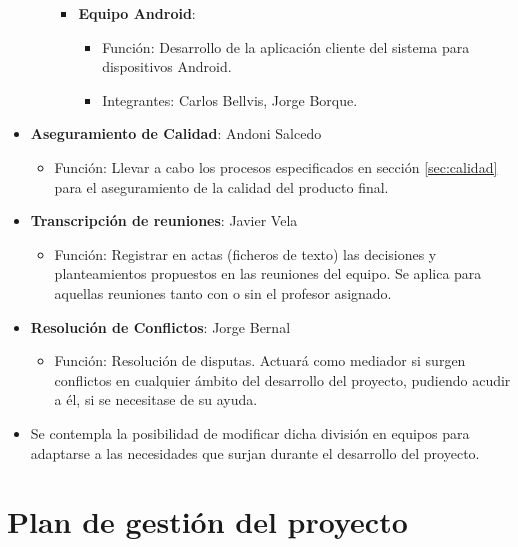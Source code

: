 \documentclass{article}
\begin{document}
\begin{itemize}
\begin{itemize}
\begin{itemize}
\begin{itemize}
            \end{itemize}
            \item \textbf{Equipo Android}:
            \begin{itemize}
                \setlength{\itemsep}{0em}
                \item Función: Desarrollo de la aplicación cliente del sistema para dispositivos Android.
                \item Integrantes: Carlos Bellvis, Jorge Borque.
            \end{itemize}
        \end{itemize}
    \end{itemize}
    \item \textbf{Aseguramiento de Calidad}: Andoni Salcedo
    \begin{itemize}
        \setlength{\itemsep}{0em}
        \item Función: Llevar a cabo los procesos especificados en sección \ref{sec:calidad} para el aseguramiento de la calidad del producto final.
    \end{itemize}
    \item \textbf{Transcripción de reuniones}: Javier Vela
    \begin{itemize}
        \setlength{\itemsep}{0em}
        \item Función: Registrar en actas (ficheros de texto) las decisiones y planteamientos propuestos en las reuniones del equipo. Se aplica para aquellas reuniones tanto con o sin el profesor asignado.
    \end{itemize}
    \item \textbf{Resolución de Conflictos}: Jorge Bernal
    \begin{itemize}
        \setlength{\itemsep}{0em}
        \item Función: Resolución de disputas. Actuará como mediador si surgen conflictos en cualquier ámbito del desarrollo del proyecto, pudiendo acudir a él, si se necesitase de su ayuda.
    \end{itemize}
    \item Se contempla la posibilidad de modificar dicha división en equipos para adaptarse a las necesidades que surjan durante el desarrollo del proyecto.
\end{itemize}

\pagebreak

\section{Plan de gestión del proyecto}
\end{document}
